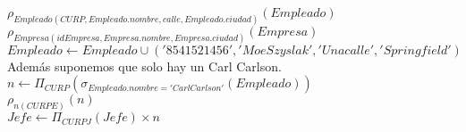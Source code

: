 \documentclass{article}
\begin{document}
\begin{enumerate}
\begin{enumerate}
				$\rho_{Empleado(CURP, Empleado.nombre, calle, Empleado.ciudad)}(Empleado)$\\
				$\rho_{Empresa(idEmpresa, Empresa.nombre, Empresa.ciudad)}(Empresa)$\\
				$Empleado \leftarrow Empleado \cup ('8541521456', 'Moe Szyslak', 'Una calle', 'Springfield')$\\
				
				Además suponemos que solo hay un Carl Carlson.\\
				
				$n \leftarrow \Pi_{CURP}(\sigma_{Empleado.nombre = 'Carl Carlson'}(Empleado))$\\
				$\rho_{n(CURPE)}(n)$\\
				$Jefe \leftarrow \Pi_{CURPJ}(Jefe) \times n$
							
			\end{enumerate}
	\end{enumerate}	
\end{document}
